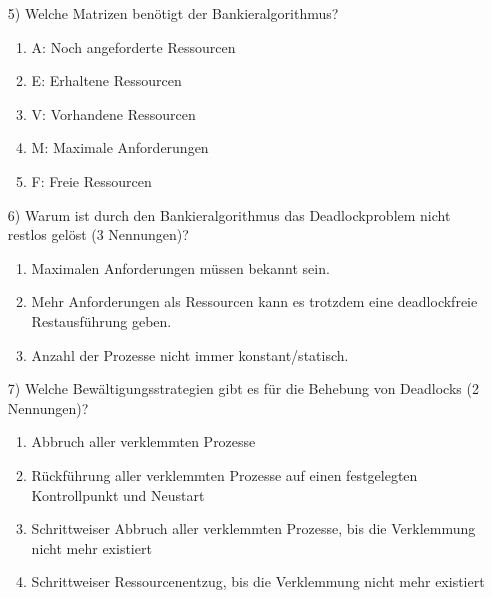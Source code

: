 \documentclass[11pt,a4paper]{article}
\begin{document}
\begin{itemize}
\item[5)] Welche Matrizen benötigt der Bankieralgorithmus?

\begin{enumerate}
\item A: Noch angeforderte Ressourcen
\item E: Erhaltene Ressourcen
\item V: Vorhandene Ressourcen
\item M: Maximale Anforderungen
\item F: Freie Ressourcen
\end{enumerate}

\item[6)] Warum ist durch den Bankieralgorithmus das Deadlockproblem nicht restlos gelöst (3 Nennungen)?

\begin{enumerate}
\item Maximalen Anforderungen müssen bekannt sein.
\item Mehr Anforderungen als Ressourcen kann es trotzdem eine deadlockfreie Restausführung geben.
\item Anzahl der Prozesse nicht immer konstant/statisch.
\end{enumerate}

\pagebreak


\item[7)] Welche Bewältigungsstrategien gibt es für die Behebung von Deadlocks (2 Nennungen)?
\begin{enumerate}
\item Abbruch aller verklemmten Prozesse 
\item Rückführung aller verklemmten Prozesse auf einen festgelegten Kontrollpunkt und Neustart
\item Schrittweiser Abbruch aller verklemmten Prozesse, bis die Verklemmung nicht mehr existiert
\item Schrittweiser Ressourcenentzug,  bis die Verklemmung nicht mehr existiert 
\end{enumerate}
\end{itemize}
\end{document}
